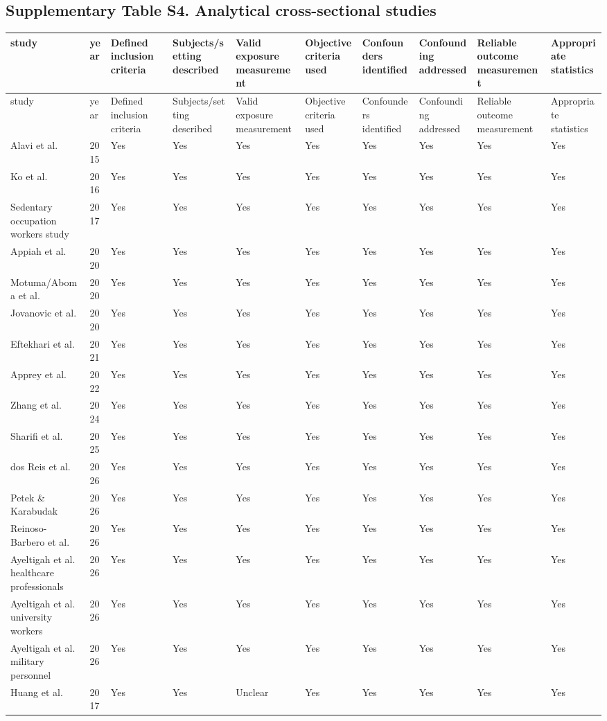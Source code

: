 \documentclass[10pt]{article}
\begin{document}
\subsection*{Supplementary Table S4. Analytical cross-sectional studies}
\scriptsize
\begin{longtable}{p{} p{} p{} p{} p{} p{} p{} p{} p{} p{}}
\toprule
study & year & Defined inclusion criteria & Subjects/setting described & Valid exposure measurement & Objective criteria used & Confounders identified & Confounding addressed & Reliable outcome measurement & Appropriate statistics \\
\midrule
\endfirsthead
\toprule
study & year & Defined inclusion criteria & Subjects/setting described & Valid exposure measurement & Objective criteria used & Confounders identified & Confounding addressed & Reliable outcome measurement & Appropriate statistics \\
\midrule
\endhead
Alavi et al. & 2015 & Yes & Yes & Yes & Yes & Yes & Yes & Yes & Yes \\
Ko et al. & 2016 & Yes & Yes & Yes & Yes & Yes & Yes & Yes & Yes \\
Sedentary occupation workers study & 2017 & Yes & Yes & Yes & Yes & Yes & Yes & Yes & Yes \\
Appiah et al. & 2020 & Yes & Yes & Yes & Yes & Yes & Yes & Yes & Yes \\
Motuma/Aboma et al. & 2020 & Yes & Yes & Yes & Yes & Yes & Yes & Yes & Yes \\
Jovanovic et al. & 2020 & Yes & Yes & Yes & Yes & Yes & Yes & Yes & Yes \\
Eftekhari et al. & 2021 & Yes & Yes & Yes & Yes & Yes & Yes & Yes & Yes \\
Apprey et al. & 2022 & Yes & Yes & Yes & Yes & Yes & Yes & Yes & Yes \\
Zhang et al. & 2024 & Yes & Yes & Yes & Yes & Yes & Yes & Yes & Yes \\
Sharifi et al. & 2025 & Yes & Yes & Yes & Yes & Yes & Yes & Yes & Yes \\
dos Reis et al. & 2026 & Yes & Yes & Yes & Yes & Yes & Yes & Yes & Yes \\
Petek \& Karabudak & 2026 & Yes & Yes & Yes & Yes & Yes & Yes & Yes & Yes \\
Reinoso-Barbero et al. & 2026 & Yes & Yes & Yes & Yes & Yes & Yes & Yes & Yes \\
Ayeltigah et al. healthcare professionals & 2026 & Yes & Yes & Yes & Yes & Yes & Yes & Yes & Yes \\
Ayeltigah et al. university workers & 2026 & Yes & Yes & Yes & Yes & Yes & Yes & Yes & Yes \\
Ayeltigah et al. military personnel & 2026 & Yes & Yes & Yes & Yes & Yes & Yes & Yes & Yes \\
Huang et al. & 2017 & Yes & Yes & Unclear & Yes & Yes & Yes & Yes & Yes \\
\bottomrule
\end{longtable}
\normalsize
\end{document}
